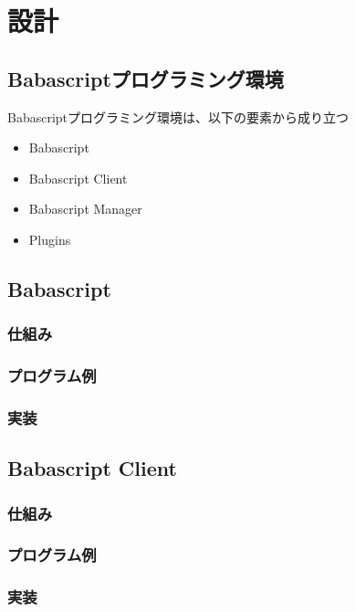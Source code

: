 \chapter{設計}
\label{chap:design}

\section{Babascriptプログラミング環境}

Babascriptプログラミング環境は、以下の要素から成り立つ

\begin{itemize}
  \item Babascript
  \item Babascript Client
  \item Babascript Manager
  \item Plugins
\end{itemize}


\section{Babascript}
\subsection{仕組み}
\subsection{プログラム例}
\subsection{実装}

\section{Babascript Client}
\subsection{仕組み}
\subsection{プログラム例}
\subsection{実装}

